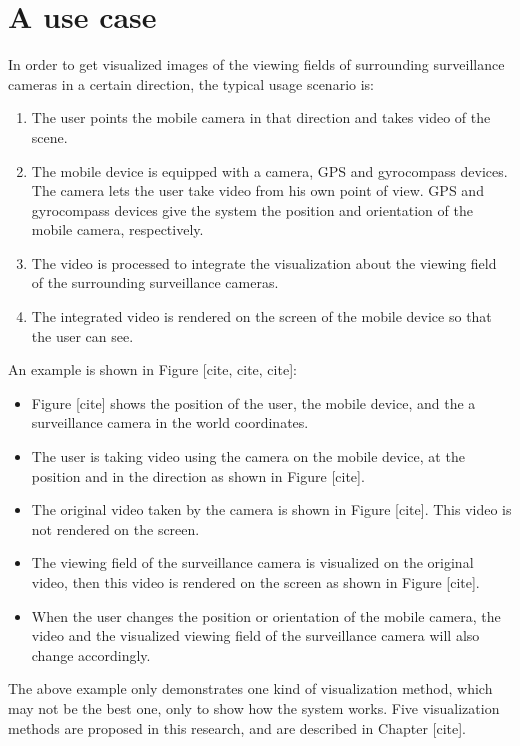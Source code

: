 \section{A use case}

In order to get visualized images of the viewing fields of surrounding surveillance cameras in a certain direction, the typical usage scenario is:

\begin{enumerate}
\item The user points the mobile camera in that direction and takes video of the scene.
\item The mobile device is equipped with a camera, GPS and gyrocompass devices. The camera lets the user take video from his own point of view. GPS and gyrocompass devices give the system the position and orientation of the mobile camera, respectively.
\item The video is processed to integrate the visualization about the viewing field of the surrounding surveillance cameras.
\item The integrated video is rendered on the screen of the mobile device so that the user can see.
\end{enumerate}

An example is shown in Figure [cite, cite, cite]:
\begin{itemize}
\item Figure [cite] shows the position of the user, the mobile device, and the a surveillance camera in the world coordinates.
\item The user is taking video using the camera on the mobile device, at the position and in the direction as shown in Figure [cite].
\item The original video taken by the camera is shown in Figure [cite]. This video is not rendered on the screen.
\item The viewing field of the surveillance camera is visualized on the original video, then this video is rendered on the screen as shown in Figure [cite].
\item When the user changes the position or orientation of the mobile camera, the video and the visualized viewing field of the surveillance camera will also change accordingly.
\end{itemize}

The above example only demonstrates one kind of visualization method, which may not be the best one, only to show how the system works. Five visualization methods are proposed in this research, and are described in Chapter [cite].
